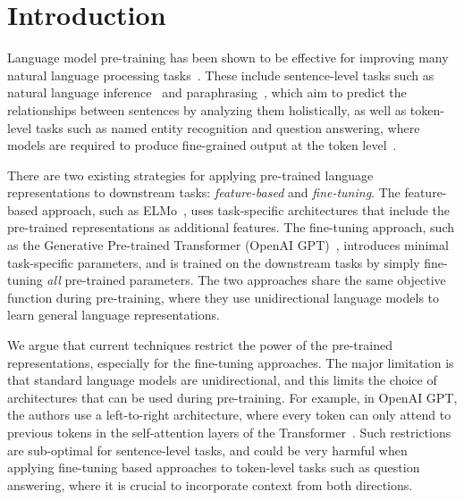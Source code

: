 \section{Introduction}


Language model pre-training has been shown to be effective for improving many natural language processing tasks~\cite{dai-le:2015:_semi, peters-etal:2018:_deep, radford-etal:2018, howard-ruder:2018}. These include sentence-level tasks such as natural language inference~\cite{bowman-etal:2015, williams-nangia-bowman:2018} and paraphrasing~\cite{dolan-brockett:2005:_autom}, which aim to predict the relationships between sentences by analyzing them holistically, as well as token-level tasks such as named entity recognition and question answering, where models are required to produce fine-grained output at the token level~\cite{tjong-de:2003, rajpurkar-etal:2016:_squad}.


There are two existing strategies for applying pre-trained language representations to downstream tasks: {\em feature-based} and {\em fine-tuning}. The feature-based approach, such as ELMo~\cite{peters-etal:2018:_deep}, uses task-specific architectures that include the pre-trained representations as additional features. The fine-tuning approach, such as the Generative Pre-trained Transformer (OpenAI GPT)~\cite{radford-etal:2018}, introduces minimal task-specific parameters, and is trained on the downstream tasks by simply fine-tuning {\em all} pre-trained parameters. The two approaches share the same objective function during pre-training, where they use unidirectional language models to learn general language representations.

We argue that current techniques restrict the power of the pre-trained representations, especially for the fine-tuning approaches. The major limitation is that standard language models are unidirectional, and this limits the choice of architectures that can be used during pre-training. For example, in OpenAI GPT, the authors use a left-to-right architecture, where every token can only attend to previous tokens in the self-attention layers of the Transformer~\cite{vaswani-etal:2017:_atten}. Such restrictions are sub-optimal for sentence-level tasks, and could be very harmful when applying fine-tuning based approaches to token-level tasks such as  question answering, where it is crucial to incorporate context from both directions.

